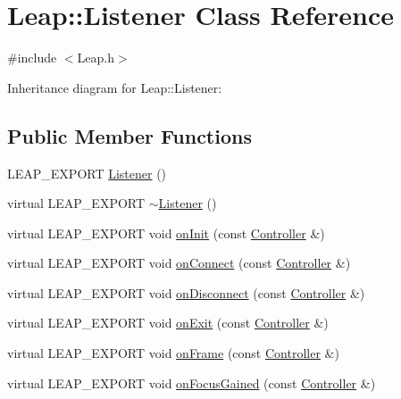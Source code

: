 \hypertarget{class_leap_1_1_listener}{}\section{Leap\+:\+:Listener Class Reference}
\label{class_leap_1_1_listener}


{\ttfamily \#include $<$Leap.\+h$>$}



Inheritance diagram for Leap\+:\+:Listener\+:
\subsection*{Public Member Functions}
\begin{DoxyCompactItemize}
\item 
L\+E\+A\+P\+\_\+\+E\+X\+P\+O\+RT \hyperlink{class_leap_1_1_listener_a68f2cc4c80510c7f0bb47d1f576ffea9}{Listener} ()
\item 
virtual L\+E\+A\+P\+\_\+\+E\+X\+P\+O\+RT \hyperlink{class_leap_1_1_listener_a11a24ce72b609c45ec7010a3cb460d49}{$\sim$\+Listener} ()
\item 
virtual L\+E\+A\+P\+\_\+\+E\+X\+P\+O\+RT void \hyperlink{class_leap_1_1_listener_a180d621ad08afa5851d03d3546a82bbf}{on\+Init} (const \hyperlink{class_leap_1_1_controller}{Controller} \&)
\item 
virtual L\+E\+A\+P\+\_\+\+E\+X\+P\+O\+RT void \hyperlink{class_leap_1_1_listener_adfef79f9a03b342384aaa17f3a8ebf15}{on\+Connect} (const \hyperlink{class_leap_1_1_controller}{Controller} \&)
\item 
virtual L\+E\+A\+P\+\_\+\+E\+X\+P\+O\+RT void \hyperlink{class_leap_1_1_listener_ac031e2d95b530097e2060518a9190f5e}{on\+Disconnect} (const \hyperlink{class_leap_1_1_controller}{Controller} \&)
\item 
virtual L\+E\+A\+P\+\_\+\+E\+X\+P\+O\+RT void \hyperlink{class_leap_1_1_listener_ac8f779a9208101f0084953560923f88c}{on\+Exit} (const \hyperlink{class_leap_1_1_controller}{Controller} \&)
\item 
virtual L\+E\+A\+P\+\_\+\+E\+X\+P\+O\+RT void \hyperlink{class_leap_1_1_listener_ab600421108bbc952d8f0f144384ca30f}{on\+Frame} (const \hyperlink{class_leap_1_1_controller}{Controller} \&)
\item 
virtual L\+E\+A\+P\+\_\+\+E\+X\+P\+O\+RT void \hyperlink{class_leap_1_1_listener_ab52aa99ad9e8fd0f35d9dffc3ef9f027}{on\+Focus\+Gained} (const \hyperlink{class_leap_1_1_controller}{Controller} \&)
\item 

\end{DoxyCompactItemize}
